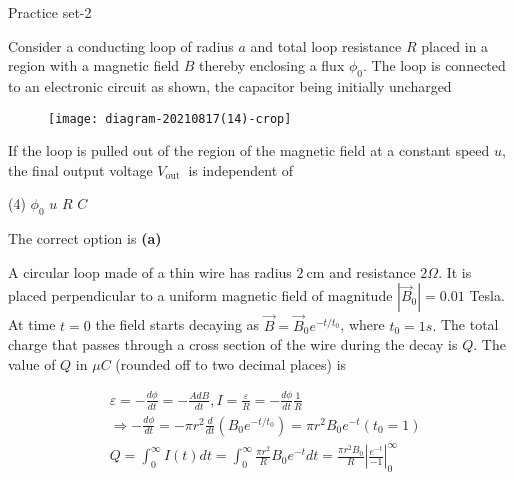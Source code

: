 \newpage
\begin{abox}
	Practice set-2 
\end{abox}
\begin{enumerate}
	\begin{minipage}{\textwidth}
		\item Consider a conducting loop of radius $a$ and total loop resistance $R$ placed in a region with a magnetic field $B$ thereby enclosing a flux $\phi_{0}$. The loop is connected to an electronic circuit as shown, the capacitor being initially uncharged\\
		\begin{figure}[H]
			\centering
			\texttt{[image: diagram-20210817(14)-crop]}
		\end{figure}
		If the loop is pulled out of the region of the magnetic field at a constant speed $u$, the final output voltage $V_{\text {out }}$ is independent of
	\end{minipage}
	\begin{tasks}(4)
		\task[\textbf{A.}] $\phi_{0}$
		\task[\textbf{B.}]$u$ 
		\task[\textbf{C.}]$R$
		\task[\textbf{D.}] $C$ 
	\end{tasks}
	\begin{answer}
		The correct option is \textbf{(a)}	
	\end{answer}
	\begin{minipage}{\textwidth}
		\item A circular loop made of a thin wire has radius $2 \mathrm{~cm}$ and resistance $2 \Omega$. It is placed perpendicular to a uniform magnetic field of magnitude $\left|\vec{B}_{0}\right|=0.01$ Tesla. At time $t=0$ the field starts decaying as $\vec{B}=\vec{B}_{0} e^{-t / t_{0}}$, where $t_{0}=1 s .$ The total charge that passes through a cross section of the wire during the decay is $Q$. The value of $Q$ in $\mu C$ (rounded off to two decimal places) is
	\end{minipage}
	\begin{answer}
		\begin{align*}
		& \varepsilon=-\frac{d \phi}{d t}=-\frac{A d B}{d t}, I=\frac{\varepsilon}{R}=-\frac{d \phi}{d t} \frac{1}{R} \\
		&\Rightarrow-\frac{d \phi}{d t}=-\pi r^{2} \frac{d}{d t}\left(B_{0} e^{-t / t_{0}}\right)=\pi r^{2} B_{0} e^{-t}\left(t_{0}=1\right) \\
		&Q=\int_{0}^{\infty} I(t) d t=\int_{0}^{\infty} \frac{\pi r^{2}}{R} B_{0} e^{-t} d t=\frac{\pi r^{2} B_{0}}{R}\left|\frac{e^{-t}}{-1}\right|_{0}^{\infty} \\

\end{align*}
\end{answer}
\end{enumerate}
